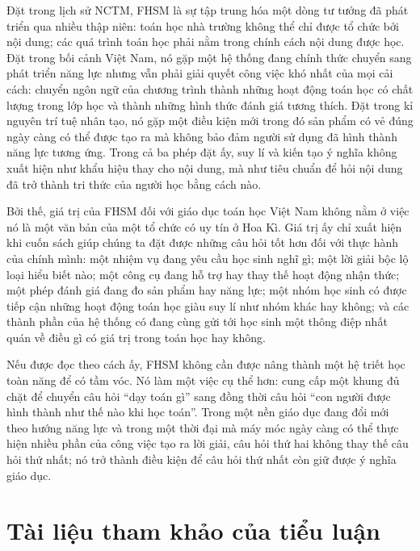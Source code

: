 Đặt trong lịch sử NCTM, FHSM là sự tập trung hóa một dòng tư tưởng đã phát
triển qua nhiều thập niên: toán học nhà trường không thể chỉ được tổ chức bởi
nội dung; các quá trình toán học phải nằm trong chính cách nội dung được học.
Đặt trong bối cảnh Việt Nam, nó gặp một hệ thống đang chính thức chuyển sang
phát triển năng lực nhưng vẫn phải giải quyết công việc khó nhất của mọi cải
cách: chuyển ngôn ngữ của chương trình thành những hoạt động toán học có chất
lượng trong lớp học và thành những hình thức đánh giá tương thích. Đặt trong
kỉ nguyên trí tuệ nhân tạo, nó gặp một điều kiện mới trong đó sản phẩm có vẻ
đúng ngày càng có thể được tạo ra mà không bảo đảm người sử dụng đã hình thành
năng lực tương ứng. Trong cả ba phép đặt ấy, suy lí và kiến tạo ý nghĩa không
xuất hiện như khẩu hiệu thay cho nội dung, mà như tiêu chuẩn để hỏi nội dung
đã trở thành tri thức của người học bằng cách nào.

Bởi thế, giá trị của FHSM đối với giáo dục toán học Việt Nam không nằm ở việc
nó là một văn bản của một tổ chức có uy tín ở Hoa Kì. Giá trị ấy chỉ xuất hiện
khi cuốn sách giúp chúng ta đặt được những câu hỏi tốt hơn đối với thực hành
của chính mình: một nhiệm vụ đang yêu cầu học sinh nghĩ gì; một lời giải bộc
lộ loại hiểu biết nào; một công cụ đang hỗ trợ hay thay thế hoạt động nhận
thức; một phép đánh giá đang đo sản phẩm hay năng lực; một nhóm học sinh có
được tiếp cận những hoạt động toán học giàu suy lí như nhóm khác hay không;
và các thành phần của hệ thống có đang cùng gửi tới học sinh một thông điệp
nhất quán về điều gì có giá trị trong toán học hay không.

Nếu được đọc theo cách ấy, FHSM không cần được nâng thành một hệ triết học
toàn năng để có tầm vóc. Nó làm một việc cụ thể hơn: cung cấp một khung đủ
chặt để chuyển câu hỏi ``dạy toán gì'' sang đồng thời câu hỏi ``con người
được hình thành như thế nào khi học toán''. Trong một nền giáo dục đang đổi
mới theo hướng năng lực và trong một thời đại mà máy móc ngày càng có thể thực
hiện nhiều phần của công việc tạo ra lời giải, câu hỏi thứ hai không thay thế
câu hỏi thứ nhất; nó trở thành điều kiện để câu hỏi thứ nhất còn giữ được ý
nghĩa giáo dục.

\section*{Tài liệu tham khảo của tiểu luận}

\begingroup
\small
\setlength{\parindent}{0pt}
\setlength{\parskip}{0.55\baselineskip}

